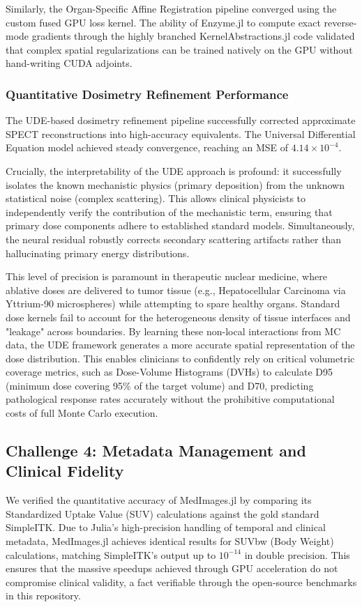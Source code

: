 \documentclass[10pt,letterpaper]{article}
\begin{document}
Similarly, the Organ-Specific Affine Registration pipeline converged using the custom fused GPU loss kernel. The ability of Enzyme.jl to compute exact reverse-mode gradients through the highly branched KernelAbstractions.jl code validated that complex spatial regularizations can be trained natively on the GPU without hand-writing CUDA adjoints.

\subsubsection{Quantitative Dosimetry Refinement Performance}
The UDE-based dosimetry refinement pipeline successfully corrected approximate SPECT reconstructions into high-accuracy equivalents. The Universal Differential Equation model achieved steady convergence, reaching an MSE of $4.14 \times 10^{-4}$.

Crucially, the interpretability of the UDE approach is profound: it successfully isolates the known mechanistic physics (primary deposition) from the unknown statistical noise (complex scattering). This allows clinical physicists to independently verify the contribution of the mechanistic term, ensuring that primary dose components adhere to established standard models. Simultaneously, the neural residual robustly corrects secondary scattering artifacts rather than hallucinating primary energy distributions.

This level of precision is paramount in therapeutic nuclear medicine, where ablative doses are delivered to tumor tissue (e.g., Hepatocellular Carcinoma via Yttrium-90 microspheres) while attempting to spare healthy organs. Standard dose kernels fail to account for the heterogeneous density of tissue interfaces and "leakage" across boundaries. By learning these non-local interactions from MC data, the UDE framework generates a more accurate spatial representation of the dose distribution. This enables clinicians to confidently rely on critical volumetric coverage metrics, such as Dose-Volume Histograms (DVHs) to calculate D95 (minimum dose covering 95\% of the target volume) and D70, predicting pathological response rates accurately without the prohibitive computational costs of full Monte Carlo execution.

\subsection{Challenge 4: Metadata Management and Clinical Fidelity}
We verified the quantitative accuracy of MedImages.jl by comparing its Standardized Uptake Value (SUV) calculations against the gold standard SimpleITK. Due to Julia's high-precision handling of temporal and clinical metadata, MedImages.jl achieves identical results for SUVbw (Body Weight) calculations, matching SimpleITK's output up to $10^{-14}$ in double precision. This ensures that the massive speedups achieved through GPU acceleration do not compromise clinical validity, a fact verifiable through the open-source benchmarks in this repository.
\end{document}

